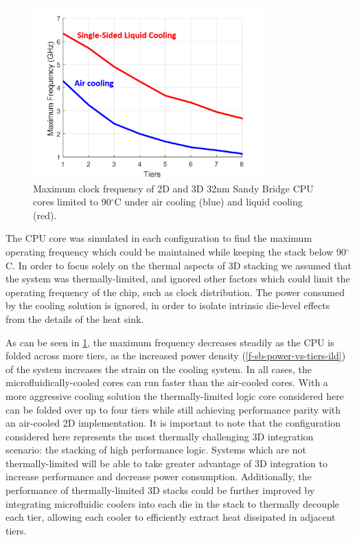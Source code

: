 \documentclass[journal,twoside]{IEEEtran}
\newcommand{\changed}[1]{\textcolor{red}{#1}}
\newcommand{\rechanged}[1]{\textcolor{red}{#1}}
\newcommand{\rerechanged}[1]{\textcolor{red}{#1}}
\renewcommand{\rechanged}[1]{#1} %
\renewcommand{\changed}[1]{#1} %
\renewcommand{\rerechanged}[1]{#1} %
\begin{document}
\begin{figure}[tb]
	\centering
	\includegraphics[width=3.5in]{Figures/SB3D_max_frequency__air_vs_water_cooling_2.png}
	\caption{
		Maximum clock frequency of 2D and 3D 32nm Sandy Bridge CPU cores limited to 90$^\circ$C under air cooling (blue)
		and \rechanged{liquid} cooling (red).
		}
	\label{f-sb3d-freq-vs-tiers}
\end{figure}



The CPU core was simulated in each configuration to find 
the maximum operating frequency which could be maintained while keeping the stack below 90$^\circ$C.
\changed{In order to focus solely on the thermal aspects of 3D stacking we assumed that the system was thermally-limited, and ignored other
factors which could limit the operating frequency of the chip, such as clock distribution.
The power consumed by the cooling solution is ignored, in order to isolate intrinsic die-level
effects from the details of the heat sink.}

As can be seen in \cref{f-sb3d-freq-vs-tiers}, the maximum frequency decreases steadily as the CPU is folded across
more tiers, as the increased power density (\cref{f-sb-power-vs-tiers-ild}) of the
system increases the strain on the cooling system.
\changed{In all cases, the microfluidically-cooled cores can run faster than the air-cooled cores.}
With a more aggressive cooling solution the \rerechanged{thermally-limited} logic core considered here can be folded over up
to four tiers while still achieving performance parity with an air-cooled 2D implementation.
\rerechanged{It is important to note that the configuration considered here represents the most thermally challenging 3D integration scenario:
the stacking of high performance logic. 
\rerechanged{Systems which are not thermally-limited will be able to take greater advantage of 3D integration to increase performance and
decrease power consumption.}
\rechanged{Additionally, the performance of thermally-limited 3D stacks could be further improved by
integrating microfluidic coolers into each die in the stack to
thermally decouple each tier, allowing each cooler to efficiently extract heat dissipated in adjacent tiers.}}
\end{document}
